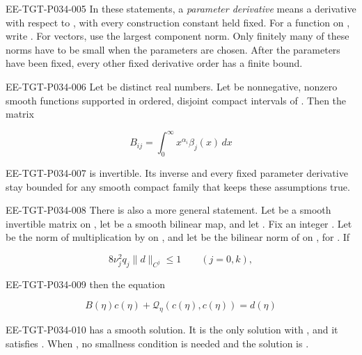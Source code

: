 \begin{EESegment}{EE-TGT-P034-005}
In these statements, a \emph{parameter derivative} means a derivative with
respect to , with every construction constant held
fixed. For a function on , write
.
For vectors, use the largest component norm. Only finitely many of these
norms have to be small when the parameters are chosen. After the parameters
have been fixed, every other fixed derivative order has a finite bound.
\end{EESegment}

\begin{lemma}\label{lem:4.7}
\begin{EESegment}{EE-TGT-P034-006}
Let  be distinct real numbers.
Let  be nonnegative, nonzero
smooth functions supported in ordered, disjoint compact intervals of
. Then the matrix
\end{EESegment}
\[
  B_{ij}=\int_0^\infty x^{\alpha_i}\beta_j(x)\,dx
\]
\begin{EESegment}{EE-TGT-P034-007}
is invertible. Its inverse and every fixed parameter derivative stay bounded
for any smooth compact family that keeps these assumptions true.
\end{EESegment}

\begin{EESegment}{EE-TGT-P034-008}
There is also a more general statement. Let
 be a smooth invertible matrix on
, let
 be a smooth bilinear map, and let
. Fix an integer
. Let  be the norm of multiplication by
 on , and let
 be the bilinear norm of
 on , for
. If
\end{EESegment}
\[
  8\nu_j^2q_j\|d\|_{C^j}\leq1\qquad(j=0,k),
\]
\begin{EESegment}{EE-TGT-P034-009}
then the equation
\end{EESegment}
\[
  B(\eta)c(\eta)+\mathcal Q_\eta(c(\eta),c(\eta))=d(\eta)
\]
\begin{EESegment}{EE-TGT-P034-010}
has a smooth solution. It is the only solution with
, and it satisfies
. When
, no smallness condition is needed and the
solution is .
\end{EESegment}
\end{lemma}

